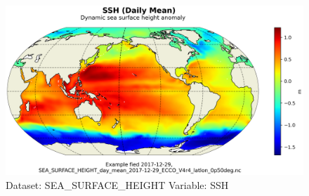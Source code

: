 \begin{figure}[H]
\centering
\includegraphics[scale=0.55]{../images/plots/latlon_plots/Sea_Surface_Height/SSH.png}
\caption{Dataset: SEA\_SURFACE\_HEIGHT Variable: SSH}
\label{tab:table-SEA_SURFACE_HEIGHT_SSH-Plot}
\end{figure}
\pagebreak
